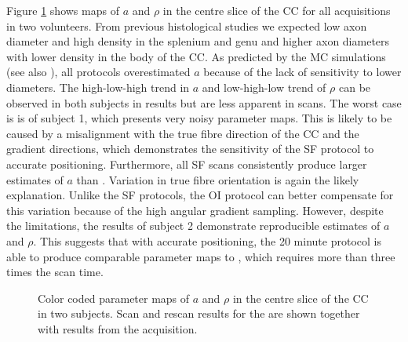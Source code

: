 Figure \ref{fig:experiment4:maps} shows maps of $a$ and $\rho$ in the centre slice of the CC for all acquisitions in two volunteers. From previous histological studies \cite{Aboitiz:1992} we expected low axon diameter and high density in the splenium and genu and higher axon diameters with lower density in the body of the CC. As predicted by the MC simulations (see also \citet{Alexander:2010}), all protocols overestimated $a$ because of the lack of sensitivity to lower diameters. The high-low-high trend in $a$ and low-high-low trend of $\rho$ can be observed in both subjects in \OIlong{} results but are less apparent in \SFshort{} scans. The worst case is is \SFshort{} of subject 1, which presents very noisy parameter maps. This is likely to be caused by a misalignment with the true fibre direction of the CC and the gradient directions, which demonstrates the sensitivity of the SF protocol to accurate positioning. Furthermore, all SF scans consistently produce larger estimates of $a$ than \OIlong{}. Variation in true fibre orientation is again the likely explanation. Unlike the SF protocols, the OI protocol can better compensate for this variation because of the high angular gradient sampling. However, despite the limitations, the results of subject 2 demonstrate reproducible estimates of $a$ and $\rho$. This suggests that with accurate positioning, the 20 minute \SFshort{} protocol is able to produce comparable parameter maps to \OIlong, which requires more than three times the scan time.
\begin{figure}
 \centering
  \caption{Color coded parameter maps of $a$ and $\rho$ in the centre slice of the CC in two subjects. Scan and rescan results for the \SFshort{} are shown together with results from the \OIlong{} acquisition.}
  \label{fig:experiment4:maps}
\end{figure}
